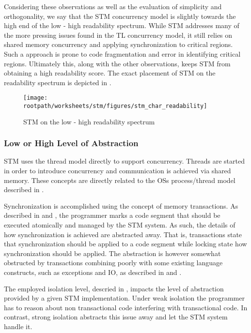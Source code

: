 Considering these observations as well as the evaluation of simplicity and orthogonality, we say that the \ac{STM} concurrency model is slightly towards the high end of the low - high readability spectrum. While \ac{STM} addresses many of the more pressing issues found in the \ac{TL} concurrency model, it still relies on shared memory concurrency and applying synchronization to critical regions. Such a approach is prone to code fragmentation and error in identifying critical regions. Ultimately this, along with the other observations, keeps \ac{STM} from obtaining a high readability score. The exact placement of \ac{STM} on the readability spectrum is depicted in .

\begin{figure}[htbp]
\centering
 \texttt{[image: \\rootpath/worksheets/stm/figures/stm\_char\_readability]} 
 \caption{\ac{STM} on the low - high readability spectrum}
\label{fig:char_stm_readability}
\end{figure}

\subsubsection{Low or High Level of Abstraction}\label{sec:stm_level_of_abstraction}
\ac{STM} uses the thread model directly to support concurrency. Threads are started in order to introduce concurrency and communication is achieved via shared memory. These concepts are directly related to the \acp{OS} process/thread model described in .

Synchronization is accomplished using the concept of memory transactions. As described in  and , the programmer marks a code segment that should be executed atomically and managed by the \ac{STM} system. As such, the details of how synchronization is achieved are abstracted away. That is, transactions state that synchronization should be applied to a code segment while locking state how synchronization should be applied. The abstraction is however somewhat obstructed by transactions combining poorly with some existing language constructs, such as exceptions and \ac{IO}, as described in  and .

The employed isolation level, descried in , impacts the level of abstraction provided by a given \ac{STM} implementation. Under weak isolation the programmer has to reason about non transactional code interfering with transactional code. In contrast, strong isolation abstracts this issue away and let the \ac{STM} system handle it.

